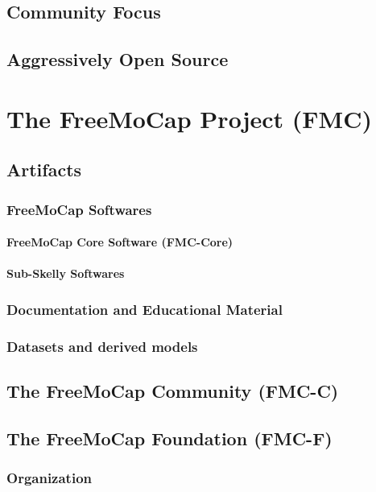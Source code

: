 \documentclass[11pt]{article}
\begin{document}
\subsection{Community Focus}
\subsection{Aggressively Open Source}


\section{The FreeMoCap Project (FMC)}

\subsection{Artifacts}

\subsubsection{FreeMoCap Softwares}
\paragraph{FreeMoCap Core Software (FMC-Core)}
\paragraph{Sub-Skelly Softwares}

\subsubsection{Documentation and Educational Material}

\subsubsection{Datasets and derived models}


\subsection{The FreeMoCap Community (FMC-C)}

\subsection{The FreeMoCap Foundation (FMC-F)}
\subsubsection{Organization}
\end{document}
